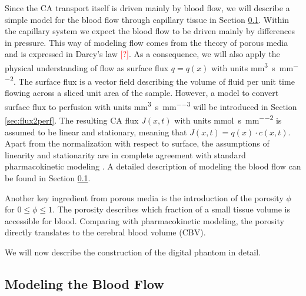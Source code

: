\documentclass[paper=a4, fontsize=11pt,parskip=half,headings=small]{scrartcl}
\newcommand{\siq}{\cubic\milli\meter\per\second\per\square\milli\meter}
\newcommand{\siP}{\cubic\milli\meter\per\second\per\cubic\milli\meter}
\newcommand{\siJ}{\milli\mol\per\second\per\square\milli\meter}
\newcommand{\missingsource}{\textcolor{red}{[?]}}
\begin{document}
	Since the CA transport itself is driven mainly by blood flow, we will describe a simple model for the blood flow through capillary tissue in Section \ref{sec:flow}.
	Within the capillary system we expect the blood flow to be driven mainly by differences in pressure.
	This way of modeling flow comes from the theory of porous media and is expressed in Darcy's law \missingsource.
	As a consequence, we will also apply the physical understanding of flow as surface flux $q = q(x)$ with units \si{\siq}.
	The surface flux is a vector field describing the volume of fluid per unit time flowing across a sliced unit area of the sample.	
	However, a model to convert surface flux to perfusion with units \si{\siP} will be introduced in Section \ref{sec:flux2perf}.
	The resulting CA flux $J(x,t)$ with units \si{\siJ} is assumed to be linear and stationary, meaning that $J(x,t) = q(x)\cdot c(x,t)$.
	Apart from the normalization with respect to surface, the assumptions of linearity and stationarity are in complete agreement with standard pharmacokinetic modeling \cite{sourbron13}.
	A detailed description of modeling the blood flow can be found in Section \ref{sec:flow}.
	
	Another key ingredient from porous media is the introduction of the porosity $\phi$ for $0 \le \phi \le 1$.
	The porosity describes which fraction of a small tissue volume is accessible for blood.
	Comparing with pharmacokinetic modeling, the porosity directly translates to the cerebral blood volume (CBV).
	
	We will now describe the construction of the digital phantom in detail.	
	
	\subsection{Modeling the Blood Flow}\label{sec:flow}
	
\end{document}
